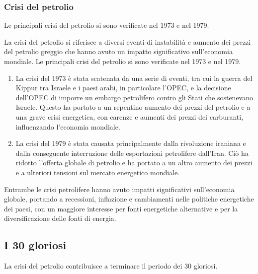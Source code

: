 \documentclass[a4paper]{article}
\begin{document}
\subsubsection{Crisi del petrolio}

Le principali crisi del petrolio si sono verificate nel 1973 e nel 1979.

La crisi del petrolio si riferisce a diversi eventi di instabilità e aumento dei prezzi del petrolio greggio che hanno avuto un impatto significativo sull'economia mondiale. Le principali crisi del petrolio si sono verificate nel 1973 e nel 1979.

\begin{enumerate}
    \item La crisi del 1973 è stata scatenata da una serie di eventi, tra cui la guerra del Kippur tra Israele e i paesi arabi, in particolare l'OPEC, e la decisione dell'OPEC di imporre un embargo petrolifero contro gli Stati che sostenevano Israele. Questo ha portato a un repentino aumento dei prezzi del petrolio e a una grave crisi energetica, con carenze e aumenti dei prezzi dei carburanti, influenzando l'economia mondiale.
    \item La crisi del 1979 è stata causata principalmente dalla rivoluzione iraniana e dalla conseguente interruzione delle esportazioni petrolifere dall'Iran. Ciò ha ridotto l'offerta globale di petrolio e ha portato a un altro aumento dei prezzi e a ulteriori tensioni sul mercato energetico mondiale.
\end{enumerate}

Entrambe le crisi petrolifere hanno avuto impatti significativi sull'economia globale, portando a recessioni, inflazione e cambiamenti nelle politiche energetiche dei paesi, con un maggiore interesse per fonti energetiche alternative e per la diversificazione delle fonti di energia.

\subsection{I 30 gloriosi}


La crisi del petrolio contribuisce a terminare il periodo dei 30 gloriosi.
\end{document}
